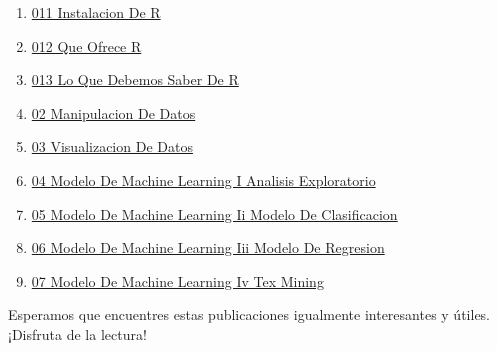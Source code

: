 \documentclass[
  jou,
  floatsintext,
  longtable,
  a4paper,
  nolmodern,
  notxfonts,
  notimes,
  12pt,
  colorlinks=true,linkcolor=blue,citecolor=blue,urlcolor=blue]{apa7}
\providecommand{\tightlist}{%
  \setlength{\itemsep}{0pt}\setlength{\parskip}{0pt}}
\begin{document}
\begin{enumerate}
\def\labelenumi{\arabic{enumi}.}
\tightlist
\item
  \href{https://numerus-scriptum.netlify.app/r/2020-06-10-011-instalacion-de-r/index.pdf}{}
  \href{https://numerus-scriptum.netlify.app/r/2020-06-10-011-instalacion-de-r}{011
  Instalacion De R}
\item
  \href{https://numerus-scriptum.netlify.app/r/2020-06-10-012-que-ofrece-r/index.pdf}{}
  \href{https://numerus-scriptum.netlify.app/r/2020-06-10-012-que-ofrece-r}{012
  Que Ofrece R}
\item
  \href{https://numerus-scriptum.netlify.app/r/2020-06-10-013-lo-que-debemos-saber-de-r/index.pdf}{}
  \href{https://numerus-scriptum.netlify.app/r/2020-06-10-013-lo-que-debemos-saber-de-r}{013
  Lo Que Debemos Saber De R}
\item
  \href{https://numerus-scriptum.netlify.app/r/2021-04-05-02-manipulacion-de-datos/index.pdf}{}
  \href{https://numerus-scriptum.netlify.app/r/2021-04-05-02-manipulacion-de-datos}{02
  Manipulacion De Datos}
\item
  \href{https://numerus-scriptum.netlify.app/r/2021-04-12-03-visualizacion-de-datos/index.pdf}{}
  \href{https://numerus-scriptum.netlify.app/r/2021-04-12-03-visualizacion-de-datos}{03
  Visualizacion De Datos}
\item
  \href{https://numerus-scriptum.netlify.app/r/2022-11-07-04-modelo-de-machine-learning-i-analisis-exploratorio/index.pdf}{}
  \href{https://numerus-scriptum.netlify.app/r/2022-11-07-04-modelo-de-machine-learning-i-analisis-exploratorio}{04
  Modelo De Machine Learning I Analisis Exploratorio}
\item
  \href{https://numerus-scriptum.netlify.app/r/2022-11-14-05-modelo-de-machine-learning-ii-modelo-de-clasificacion/index.pdf}{}
  \href{https://numerus-scriptum.netlify.app/r/2022-11-14-05-modelo-de-machine-learning-ii-modelo-de-clasificacion}{05
  Modelo De Machine Learning Ii Modelo De Clasificacion}
\item
  \href{https://numerus-scriptum.netlify.app/r/2022-11-21-06-modelo-de-machine-learning-iii-modelo-de-regresion/index.pdf}{}
  \href{https://numerus-scriptum.netlify.app/r/2022-11-21-06-modelo-de-machine-learning-iii-modelo-de-regresion}{06
  Modelo De Machine Learning Iii Modelo De Regresion}
\item
  \href{https://numerus-scriptum.netlify.app/r/2022-11-28-07-modelo-de-machine-learning-iv-tex-mining/index.pdf}{}
  \href{https://numerus-scriptum.netlify.app/r/2022-11-28-07-modelo-de-machine-learning-iv-tex-mining}{07
  Modelo De Machine Learning Iv Tex Mining}
\end{enumerate}

Esperamos que encuentres estas publicaciones igualmente interesantes y
útiles. ¡Disfruta de la lectura!
\end{document}
